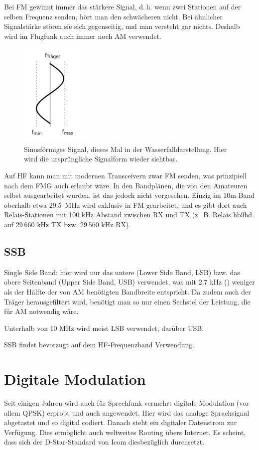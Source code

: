 Bei FM gewinnt immer das stärkere Signal, d. h. wenn zwei Stationen auf der selben Frequenz senden, hört man den schwächeren nicht. Bei ähnlicher Signalstärke stören sie sich gegenseitig, und man versteht gar nichts. Deshalb wird im Flugfunk auch immer noch AM verwendet.

\begin{figure}[h!]
 \centering
 \includegraphics[width=3cm]{./png/Amfu-FM-Wasserfall.png}
 \caption{Sinusförmiges Signal, dieses Mal in der Wasserfalldarstellung. Hier wird die ursprüngliche Signalform wieder sichtbar.}
 \label{fig:fmWaterfall}
\end{figure}

Auf HF kann man mit modernen Transceivern zwar FM senden, was prinzipiell nach dem FMG auch erlaubt wäre. In den Bandplänen, die von den Amateuren selbst ausgearbeitet wurden, ist das jedoch nicht vorgesehen. Einzig im 10m-Band oberhalb etwa 29.5 MHz wird exklusiv in FM gearbeitet, und es gibt dort auch Relais-Stationen mit 100 kHz Abstand zwischen RX und TX (z. B. Relais hb9hd auf 29 660 kHz TX bzw. 29 560 kHz RX).

\subsection{SSB}\label{sec:ssb}
Single Side Band; hier wird nur das untere (Lower Side Band, LSB) bzw. das obere Seitenband (Upper Side Band, USB) verwendet, was mit 2.7 kHz () weniger als der Hälfte der von AM benötigten Bandbreite entspricht. Da zudem auch der Träger herausgefiltert wird, benötigt man so nur einen Sechstel der Leistung, die für AM notwendig wäre.

Unterhalb von 10 MHz wird meist LSB verwendet, darüber USB.

SSB findet bevorzugt auf dem HF-Frequenzband Verwendung.

\section{Digitale Modulation}
Seit einigen Jahren wird auch für Sprechfunk vermehrt digitale Modulation (vor allem QPSK) erprobt und auch angewendet. Hier wird das analoge Sprachsignal abgetastet und so digital codiert. Danach steht ein digitaler Datenstrom zur Verfügung. Dies ermöglicht auch weltweites Routing übers Internet. Es scheint, dass sich der D-Star-Standard von Icom diesbezüglich durchsetzt.

